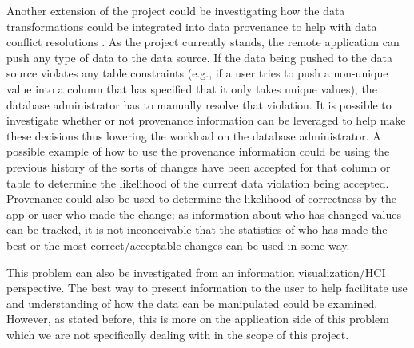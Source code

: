 \documentclass[12pt]{article}
\begin{document}
Another extension of the project could be investigating how the data transformations could be integrated into data provenance to help with data conflict resolutions \cite{arniThesis}. As the project currently stands, the remote application can push any type of data to the data source. If the data being pushed to the data source violates any table constraints (e.g., if a user tries to push a non-unique value into a column that has specified that it only takes unique values), the database administrator has to manually resolve that violation. It is possible to investigate whether or not provenance information can be leveraged to help make these decisions thus lowering the workload on the database administrator. A possible example of how to use the provenance information could be using the previous history of the sorts of changes have been accepted for that column or table to determine the likelihood of the current data violation being accepted. Provenance could also be used to determine the likelihood of correctness by the app or user who made the change; as information about who has changed values can be tracked, it is not inconceivable that the statistics of who has made the best or the most correct/acceptable changes can be used in some way.

This problem can also be investigated from an information visualization/HCI perspective. The best way to present information to the user to help facilitate use and understanding of how the data can be manipulated could be examined. However, as stated before, this is more on the application side of this problem which we are not specifically dealing with in the scope of this project. 



\end{document}
